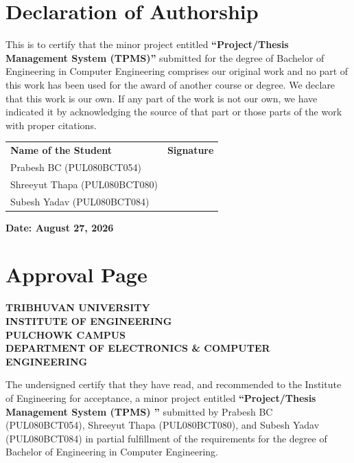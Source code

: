 \documentclass[12pt,a4paper]{report}
\begin{document}

    \chapter*{Declaration of Authorship}

    This is to certify that the minor project entitled \textbf{``Project/Thesis Management System (TPMS)''} submitted for the degree of Bachelor of Engineering in
  Computer Engineering comprises our original work and no part of this work has been used for the award of another course or degree. We declare that this work is our own.
  If any part of the work is not our own, we have indicated it by acknowledging the source of that part or those parts of the work with proper citations.

    \vspace{1.0cm}
    \noindent
    \begin{tabular}{@{}p{7cm} p{6cm}@{}}
    \textbf{Name of the Student} & \textbf{Signature}\\[0.9cm]
    Prabesh BC (PUL080BCT054) & \\[0.9cm]
    Shreeyut Thapa (PUL080BCT080) & \\[0.9cm]
    Subesh Yadav (PUL080BCT084) & \\
    \end{tabular}


\vfill
\noindent \textbf{Date: August 27, 2026}

\chapter*{Approval Page}

\begin{center}
  {\textbf{TRIBHUVAN UNIVERSITY}}\\
  {\textbf{INSTITUTE OF ENGINEERING}}\\
  {\textbf{PULCHOWK CAMPUS}}\\
  {\textbf{DEPARTMENT OF ELECTRONICS \& COMPUTER ENGINEERING}}
\end{center}

\vspace{0.3cm}
The undersigned certify that they have read, and recommended to the Institute of Engineering for acceptance, a minor project entitled \textbf{``Project/Thesis Management System (TPMS) ''} submitted by Prabesh BC (PUL080BCT054), Shreeyut Thapa (PUL080BCT080), and Subesh Yadav (PUL080BCT084) in partial fulfillment of the requirements for the degree of Bachelor of Engineering in Computer Engineering.
\end{document}
